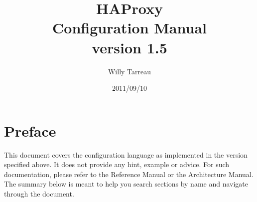 \documentclass[oneside]{book}
\title{HAProxy\\Configuration Manual\\version 1.5}
\author{Willy Tarreau}
\date{2011/09/10}
\begin{document}
\maketitle
{}


\tableofcontents



\chapter*{Preface}\normalsize
{}
\pagestyle{plain}

This document covers the configuration language as implemented in the version
specified above. It does not provide any hint, example or advice. For such
documentation, please refer to the Reference Manual or the Architecture Manual.
The summary below is meant to help you search sections by name and navigate
through the document.


\pagestyle{headings}







% 
\end{document}
